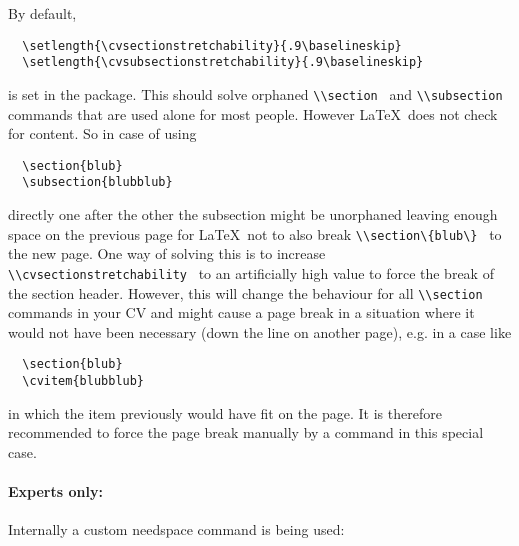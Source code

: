 \documentclass[a4paper,11pt]{article}
\newcommand{\Code}[1]{\lstinline!#1!~} %
\newcommand{\latex}{\LaTeX}
\begin{document}
By default,
\begin{lstlisting}
  \setlength{\cvsectionstretchability}{.9\baselineskip}
  \setlength{\cvsubsectionstretchability}{.9\baselineskip}
\end{lstlisting}

is set in the package. 
This should solve orphaned \Code{\\section} and \Code{\\subsection} commands that are used alone for most people. 
However \latex\ does not check for content. So in case of using
\begin{lstlisting}
  \section{blub}
  \subsection{blubblub}
\end{lstlisting}
directly one after the other the subsection might be unorphaned leaving enough space on the previous page for \latex\ not to also break \Code{\\section\{blub\}} to the new page. 
One way of solving this is to increase \Code{\\cvsectionstretchability} to an artificially high value to force the break of the section header.
However, this will change the behaviour for all \Code{\\section} commands in your CV and might cause a page break in a situation where it would not have been necessary (down the line on another page), e.g. in a case like
\begin{lstlisting}
  \section{blub}
  \cvitem{blubblub}
\end{lstlisting}

in which the item previously would have fit on the page. 
It is therefore recommended to force the page break manually by a \newpage command in this special case.

\paragraph{Experts only:}
Internally a custom needspace command is being used: 
\end{document}
